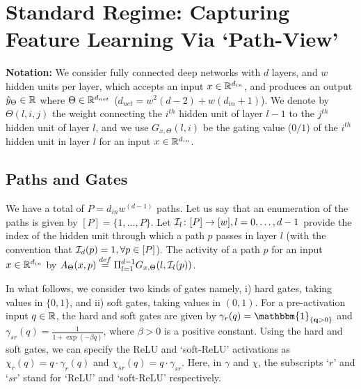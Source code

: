 \section{Standard Regime: Capturing Feature Learning Via `Path-View' }\label{sec:pathgate}
\textbf{Notation:} We consider fully connected deep networks with $d$ layers, and $w$ hidden units per layer, which accepts an input $x\in\mathbb{R}^{d_{in}}$, and produces an output $\hat{y}_{\Theta}\in \mathbb{R}$ where $\Theta\in\mathbb{R}^{d_{net}}$ ($d_{net}=w^2(d-2)+w(d_{in}+1)$). We denote by $\Theta(l,i,j)$ the weight connecting the $i^{th}$ hidden unit of layer $l-1$ to the $j^{th}$ hidden unit of layer $l$, and we use $G_{x,\Theta}(l,i)$ be the gating value ($0/1$) of the $i^{th}$ hidden unit in layer $l$ for an input $x\in \mathbb{R}^{d_{in}}$.
\subsection{Paths and Gates}
We have a total of $P=d_{in}w^{(d-1)}$ paths. Let us say that an enumeration of the paths is given by $[P]=\{1,\ldots,P\}$. Let $\mathcal{I}_{l}\colon [P]\rightarrow [w],l=0,\ldots,d-1$ provide the index of the hidden unit through which a path $p$ passes in layer $l$ (with the convention that $\mathcal{I}_d(p)=1,\forall p\in [P]$). The activity of a path $p$ for an input $x\in \mathbb{R}^{d_{in}}$ by $A_{\Theta}(x,p)\stackrel{def}{=}\Pi_{l=1}^{d-1} G_{x,\Theta}(l,\mathcal{I}_l(p))$.

In what follows, we consider two kinds of gates namely, i) hard gates, taking values in $\{0,1\}$, and ii) soft gates, taking values in $(0,1)$. For a pre-activation input $q\in\mathbb{R}$, the  hard and soft gates are given by $\gamma_{r}(q)=\mathbbm{1}_{\{\q>0\}}$ and $\gamma_{sr}(q)=\frac{1}{1+\exp(-\beta q)}$, where $\beta>0$ is a positive constant. Using the hard and soft gates, we can specify the ReLU and `soft-ReLU' activations as $\chi_{r}(q)=q\cdot\gamma_r(q)$ and $\chi_{sr}(q)=q\cdot\gamma_{sr}$. Here, in $\gamma$ and $\chi$, the subscripts `$r$' and `$sr$' stand for `ReLU' and `soft-ReLU' respectively.
